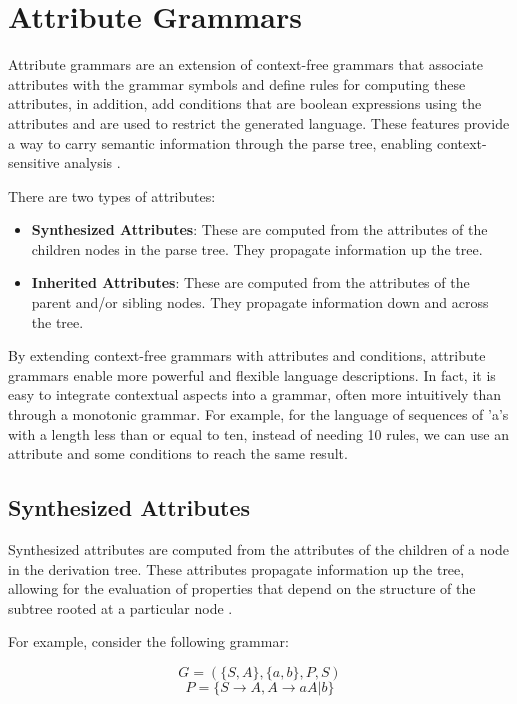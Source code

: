 \section{Attribute Grammars}

Attribute grammars are an extension of context-free 
grammars that associate attributes with the grammar symbols 
and define rules for computing these attributes, in addition, add conditions that are boolean expressions using the attributes and are used to restrict the generated language. 
These features provide a way to carry semantic information 
through the parse tree, enabling context-sensitive analysis \cite{cit5}.

There are two types of attributes:

\begin{itemize}
  \item \textbf{Synthesized Attributes}: These are computed from the attributes of the children nodes in the parse tree. They propagate information up the tree.
  \item \textbf{Inherited Attributes}: These are computed from the attributes of the parent and/or sibling nodes. They propagate information down and across the tree.
\end{itemize}

By extending context-free grammars with attributes and conditions, attribute grammars enable more powerful and flexible language descriptions. 
In fact, it is easy to integrate contextual aspects into a grammar, often more intuitively than through a monotonic grammar.
For example, for the language of sequences of 'a's with a length less than or equal to ten, instead of needing 10 rules, we can use an attribute and some conditions to reach the same result.

\subsection{Synthesized Attributes}

Synthesized attributes are computed from the attributes of the children of a node in the derivation tree. These attributes propagate information up the tree, allowing for the evaluation of properties that depend on the structure of the subtree rooted at a particular node \cite{cit5}.

For example, consider the following grammar:

\[ G = ( \{S, A\}, \{a, b\}, P, S ) \]
\[  P = \{ S \rightarrow A, A \rightarrow aA | b \} \]
  
